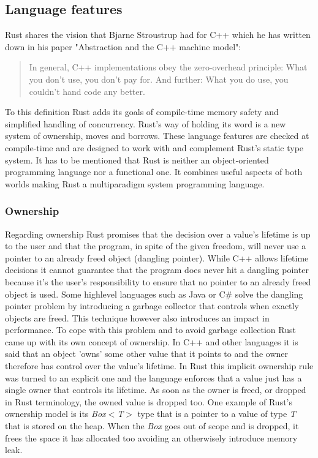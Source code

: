 \documentclass[lnbip]{svmultln}
\begin{document}
%
\subsection{Language features}
%
 Rust shares the vision that Bjarne Stroustrup had for C++ which he has written down in his paper "Abstraction and the C++ machine model":

\begin{quote}
	In general, C++ implementations obey the zero-overhead principle: What you
	don't use, you don't pay for. And further: What you do use, you
	couldn't hand code any better. \cite{Stroustrup2005}
\end{quote}

To this definition Rust adds its goals of compile-time memory safety and simplified handling of concurrency. Rust's way of holding its word is a new system of ownership, moves and borrows. These language features are checked at compile-time and are designed to work with and complement Rust's static type system. It has to be mentioned that Rust is neither an object-oriented programming language nor a functional one. It combines useful aspects of both worlds making Rust a multiparadigm system programming language.

%
\subsubsection{Ownership}
%
Regarding ownership Rust promises that the decision over a value's lifetime is up to the user and that the program, in spite of the given freedom, will never use a pointer to an already freed object (dangling pointer). While C++ allows lifetime decisions it cannot guarantee that the program does never hit a dangling pointer because it's the user's responsibility to ensure that no pointer to an already freed object is used.
Some highlevel languages such as Java or C\# solve the dangling pointer problem by introducing a garbage collector that controls when exactly objects are freed. This technique however also introduces an impact in performance.
To cope with this problem and to avoid garbage collection Rust came up with its own concept of ownership. In C++ and other languages it is said that an object 'owns' some other value that it points to and the owner therefore has control over the value's lifetime. In Rust this implicit ownership rule was turned to an explicit one and the language enforces that a value just has a single owner that controls its lifetime. As soon as the owner is freed, or dropped in Rust terminology, the owned value is dropped too. One example of Rust's ownership model is its \textit{Box$<$T$>$} type that is a pointer to a value of type \textit{T} that is stored on the heap. When the \textit{Box} goes out of scope and is dropped, it frees the space it has allocated too avoiding an otherwisely introduce memory leak. \cite[Chapter 4. Ownership]{ProgrammingRust}
%
\end{document}
